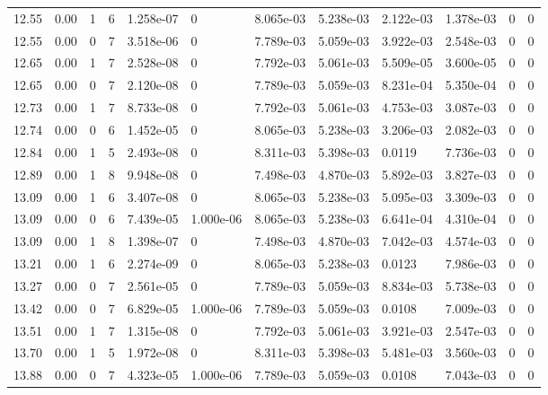 \documentclass[preview]{standalone}
\begin{document}
{{{{{\begin{tabular}{L{1.2cm}C{1.2cm} C{0.3cm}C{0.5cm} C{1.4cm}C{1.4cm} C{1.4cm}C{1.4cm} C{1.6cm}C{1.6cm} C{1.6cm}C{1.6cm}}
  12.55  &  0.00  & 1     &  6 &  1.258e-07  & 0  &  8.065e-03&   5.238e-03& 2.122e-03 & 1.378e-03   &  0 & 0  \\ 
  12.55  &  0.00  & 0     &  7 &  3.518e-06  & 0  &  7.789e-03&   5.059e-03& 3.922e-03 & 2.548e-03   &  0 & 0  \\ 
  12.65  &  0.00  & 1     &  7 &  2.528e-08  & 0  &  7.792e-03&   5.061e-03& 5.509e-05 & 3.600e-05   &  0 & 0  \\ 
  12.65  &  0.00  & 0     &  7 &  2.120e-08  & 0  &  7.789e-03&   5.059e-03& 8.231e-04 & 5.350e-04   &  0 & 0  \\ 
  12.73  &  0.00  & 1     &  7 &  8.733e-08  & 0  &  7.792e-03&   5.061e-03& 4.753e-03 & 3.087e-03   &  0 & 0  \\ 
  12.74  &  0.00  & 0     &  6 &  1.452e-05  & 0  &  8.065e-03&   5.238e-03& 3.206e-03 & 2.082e-03   &  0 & 0  \\ 
  12.84  &  0.00  & 1     &  5 &  2.493e-08  & 0  &  8.311e-03&   5.398e-03& 0.0119 & 7.736e-03   &  0 & 0  \\ 
  12.89  &  0.00  & 1     &  8 &  9.948e-08  & 0  &  7.498e-03&   4.870e-03& 5.892e-03 & 3.827e-03   &  0 & 0  \\ 
  13.09  &  0.00  & 1     &  6 &  3.407e-08  & 0  &  8.065e-03&   5.238e-03& 5.095e-03 & 3.309e-03   &  0 & 0  \\ 
  13.09  &  0.00  & 0     &  6 &  7.439e-05  & 1.000e-06  &  8.065e-03&   5.238e-03& 6.641e-04 & 4.310e-04   &  0 & 0  \\ 
  13.09  &  0.00  & 1     &  8 &  1.398e-07  & 0  &  7.498e-03&   4.870e-03& 7.042e-03 & 4.574e-03   &  0 & 0  \\ 
  13.21  &  0.00  & 1     &  6 &  2.274e-09  & 0  &  8.065e-03&   5.238e-03& 0.0123 & 7.986e-03   &  0 & 0  \\ 
  13.27  &  0.00  & 0     &  7 &  2.561e-05  & 0  &  7.789e-03&   5.059e-03& 8.834e-03 & 5.738e-03   &  0 & 0  \\ 
  13.42  &  0.00  & 0     &  7 &  6.829e-05  & 1.000e-06  &  7.789e-03&   5.059e-03& 0.0108 & 7.009e-03   &  0 & 0  \\ 
  13.51  &  0.00  & 1     &  7 &  1.315e-08  & 0  &  7.792e-03&   5.061e-03& 3.921e-03 & 2.547e-03   &  0 & 0  \\ 
  13.70  &  0.00  & 1     &  5 &  1.972e-08  & 0  &  8.311e-03&   5.398e-03& 5.481e-03 & 3.560e-03   &  0 & 0  \\ 
  13.88  &  0.00  & 0     &  7 &  4.323e-05  & 1.000e-06  &  7.789e-03&   5.059e-03& 0.0108 & 7.043e-03   &  0 & 0  \\ 

\end{tabular}}}}}}
\end{document}
